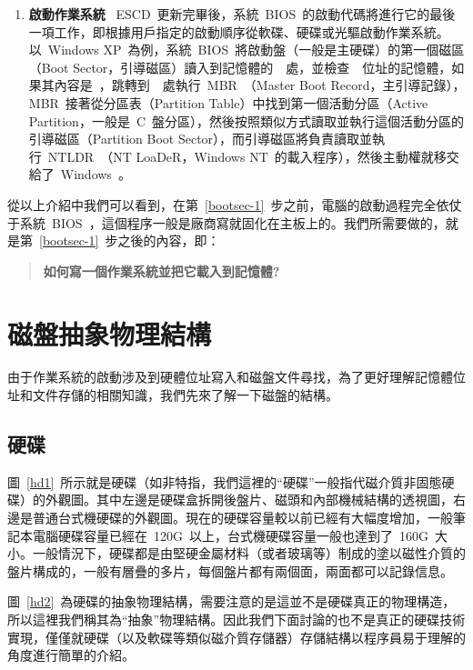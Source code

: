 \begin{enumerate}
\item{\textbf{啟動作業系統}} \label{bootsec-1} ~ESCD~更新完畢後，系統~BIOS~的啟動代碼將進行它的最後一項工作，即根據用戶指定的啟動順序從軟碟、硬碟或光驅啟動作業系統。以~Windows XP~為例，系統~BIOS~將啟動盤（一般是主硬碟）的第一個磁區（Boot Sector，引導磁區）讀入到記憶體的~~處，並檢查~~位址的記憶體，如果其內容是~，跳轉到~~處執行~MBR~（Master Boot Record，主引導記錄），MBR~接著從分區表（Partition Table）中找到第一個活動分區（Active Partition，一般是~C~盤分區），然後按照類似方式讀取並執行這個活動分區的引導磁區（Partition Boot Sector），而引導磁區將負責讀取並執行~NTLDR~（NT LoaDeR，Windows NT~的載入程序），然後主動權就移交給了~Windows~。
\end{enumerate}

從以上介紹中我們可以看到，在第~\ref{bootsec-1}~步之前，電腦的啟動過程完全依仗于系統~BIOS~，這個程序一般是廠商寫就固化在主板上的。我們所需要做的，就是第~\ref{bootsec-1}~步之後的內容，即：
\begin{quote}
\textbf{如何寫一個作業系統並把它載入到記憶體?}
\end{quote}

\section{磁盤抽象物理結構}\label{disk_structure}

由于作業系統的啟動涉及到硬體位址寫入和磁盤文件尋找，為了更好理解記憶體位址和文件存儲的相關知識，我們先來了解一下磁盤的結構。

\subsection{硬碟}


圖~\ref{hd1}~所示就是硬碟（如非特指，我們這裡的“硬碟”一般指代磁介質非固態硬碟）的外觀圖。其中左邊是硬碟盒拆開後盤片、磁頭和內部機械結構的透視圖，右邊是普通台式機硬碟的外觀圖。現在的硬碟容量較以前已經有大幅度增加，一般筆記本電腦硬碟容量已經在~120G~以上，台式機硬碟容量一般也達到了~160G~大小。一般情況下，硬碟都是由堅硬金屬材料（或者玻璃等）制成的塗以磁性介質的盤片構成的，一般有層疊的多片，每個盤片都有兩個面，兩面都可以記錄信息。


圖~\ref{hd2}~為硬碟的抽象物理結構，需要注意的是這並不是硬碟真正的物理構造，所以這裡我們稱其為“抽象”物理結構。因此我們下面討論的也不是真正的硬碟技術實現，僅僅就硬碟（以及軟碟等類似磁介質存儲器）存儲結構以程序員易于理解的角度進行簡單的介紹。

